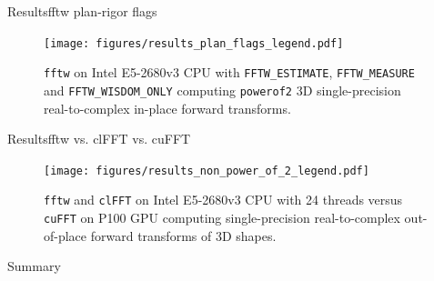 \documentclass[t,10pt,hyperref={
  pdftitle = {gearshifft},
  pdfsubject = {gearshifft},
  pdfborder={0 0 0},
  colorlinks=true,
  urlcolor=red,
  citecolor=red,
  linkcolor=red,
  pdfauthor={Peter Steinbach, Matthias Werner}
  }
]{beamer}
\def\resetbeamertemplate{\setbeamertemplate{background canvas}{ }}
\newcommand{\fftw}{\texttt{fftw}}
\newcommand{\cufft}{\texttt{cuFFT}}
\newcommand{\clfft}{\texttt{clFFT}}
\newcommand{\mc}[1]{\lstinline!#1!}
\begin{document}
\begin{frame}{Results}{fftw plan-rigor flags}
\begin{figure}[!htbp]
  \centering
  \texttt{[image: figures/results\_plan\_flags\_legend.pdf]}\\[-.5em]
  \hfill
  \caption{\fftw{} on Intel E5-2680v3 CPU with \mc{FFTW_ESTIMATE}, \mc{FFTW_MEASURE} and \mc{FFTW_WISDOM_ONLY} computing \texttt{powerof2} 3D single-precision real-to-complex in-place forward transforms.}
  \label{fig:fftw_plan_flags}
\end{figure}
\end{frame}


\begin{frame}{Results}{fftw vs. clFFT vs. cuFFT}
\begin{figure}[!tbp]
  \centering
  \texttt{[image: figures/results\_non\_power\_of\_2\_legend.pdf]}\\[-1em]
  \hfill
  \caption{\fftw{} and \clfft{} on Intel E5-2680v3 CPU with 24 threads versus \cufft{} on P100 GPU computing single-precision real-to-complex out-of-place forward transforms of 3D shapes.}
  \label{fig:non_power_of_2}
\end{figure}
\end{frame}

\begin{frame}[plain]
\end{frame}

\resetbeamertemplate

\begin{frame}{Summary}{}
\end{frame}
\end{document}
